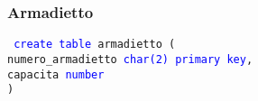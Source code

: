 \documentclass{article}
\begin{document}
    \subsubsection{Armadietto}
    \begin{flushleft}
        \texttt{
        \textcolor{blue}{create table} armadietto ( \\
        \hspace*{2em} numero\_armadietto \hspace*{2em} \textcolor{blue}{char(2)} \hspace*{4em} \textcolor{blue}{primary key}, \\
        \hspace*{2em} capacita \hspace*{6.3em} \textcolor{blue}{number} \\)}
    \end{flushleft}
\end{document}
